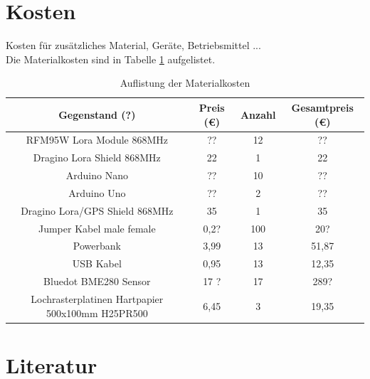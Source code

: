 \documentclass[a4paper,11pt,DIV=calc,tablecaptionabove,headinclude,twoside]{article}
\begin{document}
\section{Kosten}
Kosten für zusätzliches Material, Geräte, Betriebsmittel ...\\
Die Materialkosten sind in Tabelle \ref{Tab:Kosten} aufgelistet.
\begin{table}[h]
\caption{Auflistung der Materialkosten}
\begin{tabular}{|c|c|c|c|}
\hline
Gegenstand (?) & Preis (\euro) & Anzahl & Gesamtpreis (\euro) \\\hline \hline
RFM95W Lora Module 868MHz  & ?? & 12 & ?? \\\hline
Dragino Lora Shield 868MHz & 22 & 1 & 22 \\\hline
Arduino Nano & ?? & 10 & ?? \\\hline
Arduino Uno & ?? & 2 & ?? \\\hline
Dragino Lora/GPS Shield 868MHz & 35 & 1 & 35 \\\hline
Jumper Kabel male female & 0,2? & 100 & 20? \\\hline
Powerbank & 3,99 & 13 & 51,87 \\\hline
USB Kabel & 0,95 & 13 & 12,35 \\\hline
Bluedot BME280 Sensor & 17 ? & 17 & 289? \\\hline
Lochrasterplatinen Hartpapier 500x100mm H25PR500 & 6,45 & 3 & 19,35 \\\hline
\end{tabular}
\label{Tab:Kosten}
\end{table}

\section*{Literatur}

\end{document}
